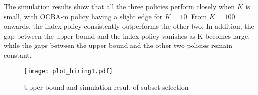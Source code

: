 The simulation results show that all the three policies perform closely when $K$ is small, with OCBA-m policy having a slight edge for $K=10$. From $K=100$ onwards, the index policy consistently outperforms the other two. In addition, the gap between the upper bound and the index policy vanishes as K becomes large, while the gaps between the upper bound and the other two policies remain constant.
\begin{figure}\label{fig:os}
\centering
\texttt{[image: plot\_hiring1.pdf]}
\caption{Upper bound and simulation result of subset selection}
\end{figure}